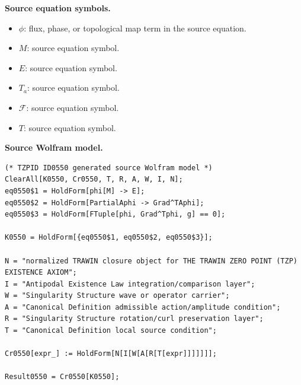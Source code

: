 \begin{minipage}[t]{0.49\linewidth}
\begingroup
\small
\raggedright
\textbf{Source equation symbols.}\par
\begin{itemize}[leftmargin=1.35em,itemsep=1pt,topsep=1pt,parsep=0pt]
    \item $\phi$: flux, phase, or topological map term in the source equation.
    \item $M$: source equation symbol.
    \item $E$: source equation symbol.
    \item $T_a$: source equation symbol.
    \item $\mathcal{F}$: source equation symbol.
    \item $T$: source equation symbol.
\end{itemize}
\endgroup
\end{minipage}\hfill
\begin{minipage}[t]{0.47\linewidth}
\begingroup
\scriptsize
\raggedright
\textbf{Source Wolfram model.}\par
\begin{Verbatim}[fontsize=\tiny,breaklines=true,breakanywhere=true]
(* TZPID ID0550 generated source Wolfram model *)
ClearAll[K0550, Cr0550, T, R, A, W, I, N];
eq0550$1 = HoldForm[phi[M] -> E];
eq0550$2 = HoldForm[PartialAphi -> Grad^TAphi];
eq0550$3 = HoldForm[FTuple[phi, Grad^Tphi, g] == 0];

K0550 = HoldForm[{eq0550$1, eq0550$2, eq0550$3}];

N = "normalized TRAWIN closure object for THE TRAWIN ZERO POINT (TZP) EXISTENCE AXIOM";
I = "Antipodal Existence Law integration/comparison layer";
W = "Singularity Structure wave or operator carrier";
A = "Canonical Definition admissible action/amplitude condition";
R = "Singularity Structure rotation/curl preservation layer";
T = "Canonical Definition local source condition";

Cr0550[expr_] := HoldForm[N[I[W[A[R[T[expr]]]]]]];

Result0550 = Cr0550[K0550];
\end{Verbatim}
\endgroup
\end{minipage}

